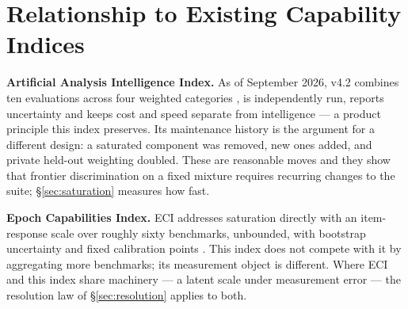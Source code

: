 \documentclass[11pt]{article}
\theoremstyle{definition}
\begin{document}
\section{Relationship to Existing Capability Indices}\label{sec:related}

\textbf{Artificial Analysis Intelligence Index.} As of September 2026, v4.2 combines ten evaluations across four weighted categories \citep{aa2026index}, is independently run, reports uncertainty and keeps cost and speed separate from intelligence --- a product principle this index preserves. Its maintenance history is the argument for a different design: a saturated component was removed, new ones added, and private held-out weighting doubled. These are reasonable moves and they show that frontier discrimination on a fixed mixture requires recurring changes to the suite; \S\ref{sec:saturation} measures how fast.

\textbf{Epoch Capabilities Index.} ECI addresses saturation directly with an item-response scale over roughly sixty benchmarks, unbounded, with bootstrap uncertainty and fixed calibration points \citep{epoch2026eci}. This index does not compete with it by aggregating more benchmarks; its measurement object is different. Where ECI and this index share machinery --- a latent scale under measurement error --- the resolution law of \S\ref{sec:resolution} applies to both.
\end{document}
